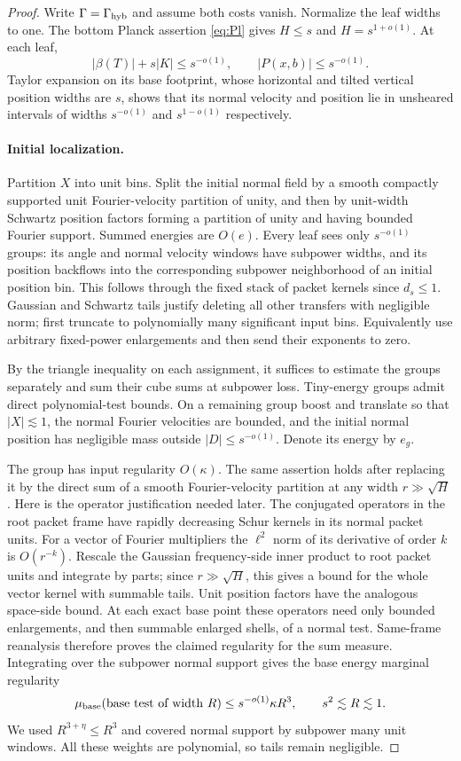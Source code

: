 \begin{proof}
Write $\Gamma=\Gamma_{\rm hyb}$ and assume both costs vanish. Normalize
the leaf widths to one. The bottom Planck assertion
\eqref{eq:Pl} gives $H\leq s$ and $H=s^{1+o(1)}$. At each leaf,
\[
 |\beta(T)|+s|K|\leq s^{-o(1)},\qquad
 |P(x,b)|\leq s^{-o(1)}.
\]
Taylor expansion on its base footprint, whose horizontal and tilted
vertical position widths are $s$, shows that its normal velocity and
position lie in unsheared intervals of widths $s^{-o(1)}$ and
$s^{1-o(1)}$ respectively.

\paragraph{Initial localization.}
Partition $X$ into unit bins. Split the initial normal field by a smooth
compactly supported unit Fourier-velocity partition of unity, and then
by unit-width Schwartz position factors forming a partition of unity
and having bounded Fourier support. Summed energies are $O(e)$.
Every leaf sees only $s^{-o(1)}$ groups: its angle and normal velocity
windows have subpower widths, and its position backflows into the
corresponding subpower neighborhood of an initial position bin.
This follows through the fixed stack of packet kernels since
$d_s\leq1$. Gaussian and Schwartz tails justify deleting all other
transfers with negligible norm; first truncate to polynomially many
significant input bins. Equivalently use arbitrary fixed-power
enlargements and then send their exponents to zero.

By the triangle inequality on each assignment, it suffices to estimate
the groups separately and sum their cube sums at subpower loss.
Tiny-energy groups admit direct polynomial-test bounds. On a remaining
group boost and translate so that $|X|\lesssim1$, the normal Fourier
velocities are bounded, and the initial normal position has negligible
mass outside $|D|\leq s^{-o(1)}$. Denote its energy by $e_g$.

The group has input regularity $O(\kappa)$. The same assertion holds
after replacing it by the direct sum of a smooth Fourier-velocity
partition at any width $r\gg\sqrt H$. Here is the operator justification
needed later. The conjugated operators in the root packet frame have
rapidly decreasing Schur kernels in its normal packet units. For a
vector of Fourier multipliers the $\ell^2$ norm of its derivative of
order $k$ is $O(r^{-k})$. Rescale the Gaussian frequency-side inner
product to root packet units and integrate by parts; since
$r\gg\sqrt H$, this gives a bound for the whole vector kernel with
summable tails. Unit position factors have the analogous space-side
bound. At each exact base point these operators need only bounded
enlargements, and then summable enlarged shells, of a normal test.
Same-frame reanalysis therefore proves the claimed regularity for the
sum measure. Integrating over the subpower normal support gives the base
energy marginal regularity
\[
 \mu_{\rm base}(\text{base test of width }R)
 \leq s^{-o(1)}\kappa R^3,
 \qquad s^2\lesssim R\lesssim1.
\]
We used $R^{3+\eta}\leq R^3$ and covered normal support by subpower
many unit windows. All these weights are polynomial, so tails remain
negligible.


\end{proof}
